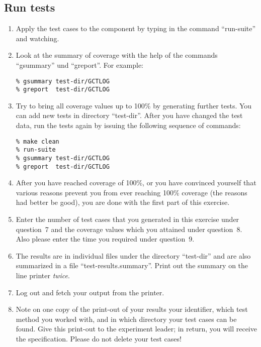 \subsection*{Run tests}

\begin{enumerate}
\addtocounter{enumi}{7}

\item Apply the test cases to the component by typing in the command 
``run-suite'' and watching. 

\item Look at the summary of coverage with the help of the commands 
``gsummary'' und ``greport''.  For example:
\begin{verbatim}
% gsummary test-dir/GCTLOG
% greport  test-dir/GCTLOG
\end{verbatim}

\item Try to bring all coverage values up to 100\% by generating
further tests. 
You can add new tests in directory ``test-dir''.
After you have changed the test data, run the tests again by issuing
the following sequence of commands:
\begin{verbatim}
% make clean 
% run-suite 
% gsummary test-dir/GCTLOG 
% greport  test-dir/GCTLOG
\end{verbatim}

\item After you have reached coverage of 100\%, or you have convinced
yourself that various reasons prevent you from ever reaching 100\%
coverage (the reasons had better be good), you are done with the first
part of this exercise.

\item Enter the number of test cases that you generated in this
exercise under question~7 and the coverage values which you attained
under question~8.
Also please enter the time you required under question~9.

\item The results are in individual files under the directory
``test-dir'' and are also summarized in a file ``test-results.summary''.
Print out the summary on the line printer {\em twice}.

\item Log out and fetch your output from the printer.

\item Note on one copy of the print-out of your results your
identifier, which test method you worked with, and in which directory
your test cases can be found.  Give this print-out to the experiment
leader; in return, you will receive the specification.  Please do not
delete your test cases!

\end{enumerate}

